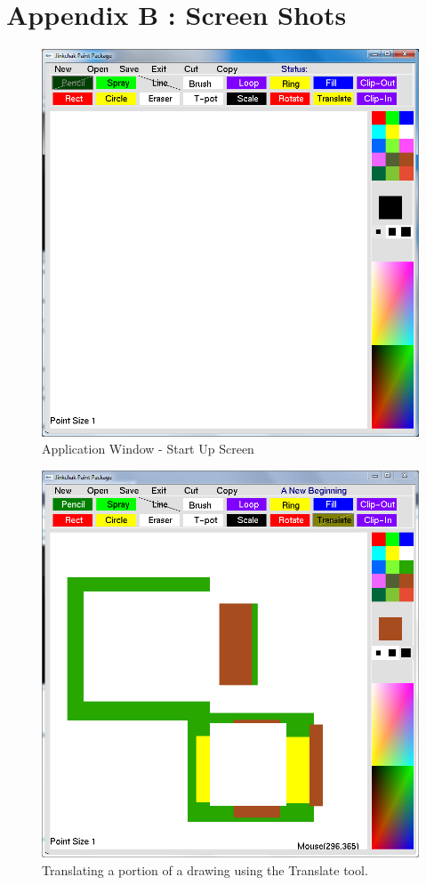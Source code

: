 \documentclass[12pt]{report}
\begin{document}
\section*{Appendix B : Screen Shots}
\begin{figure}[h!]

  \centering
    \includegraphics[scale=0.361]{screenshots/init_screen.png}
  \caption{Application Window - Start Up Screen}
\end{figure}

\begin{figure}[h!]

  \centering
    \includegraphics[scale=0.45]{screenshots/translate_demo.png}
  \caption{Translating a portion of a drawing using the Translate tool.}
\end{figure}
\end{document}
